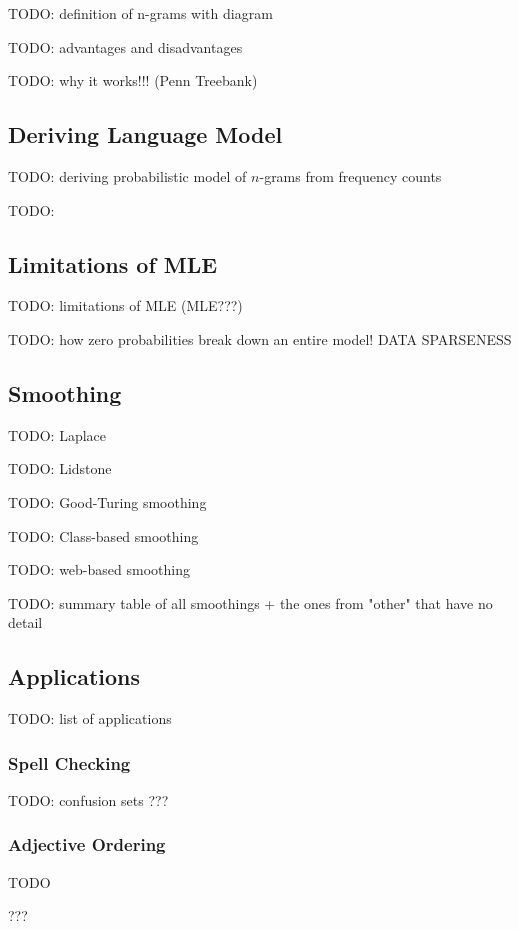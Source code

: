 \documentclass{article}
\begin{document}
TODO: definition of n-grams with diagram

TODO: advantages and disadvantages

TODO: why it works!!! (Penn Treebank)

\subsection{Deriving Language Model}

TODO: deriving probabilistic model of $n$-grams from frequency counts

TODO:

\subsection{Limitations of MLE}

TODO: limitations of MLE (MLE???)

TODO: how zero probabilities break down an entire model! DATA SPARSENESS

\subsection{Smoothing}

TODO: Laplace

TODO: Lidstone

TODO: Good-Turing smoothing

TODO: Class-based smoothing

TODO: web-based smoothing

TODO: summary table of all smoothings + the ones from "other" that have no detail

\subsection{Applications}

TODO: list of applications

\subsubsection{Spell Checking}

TODO: confusion sets
???

\subsubsection{Adjective Ordering}

TODO

???
\end{document}
